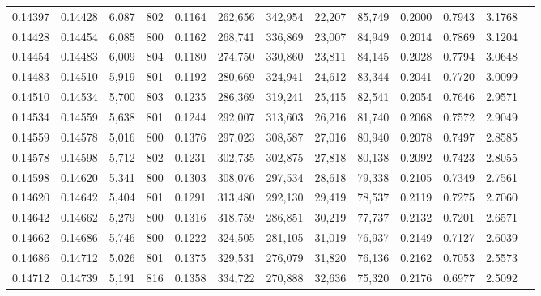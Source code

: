 \begin{tabular}{rrrrrrrrrrrrr}
0.14397 & 0.14428 &  6,087 & 802 &                                     0.1164 & 262,656 & 342,954 &  22,207 &  85,749 & 0.2000 & 0.7943 & 3.1768 \\
0.14428 & 0.14454 &  6,085 & 800 &                                     0.1162 & 268,741 & 336,869 &  23,007 &  84,949 & 0.2014 & 0.7869 & 3.1204 \\
0.14454 & 0.14483 &  6,009 & 804 &                                     0.1180 & 274,750 & 330,860 &  23,811 &  84,145 & 0.2028 & 0.7794 & 3.0648 \\
0.14483 & 0.14510 &  5,919 & 801 &                                     0.1192 & 280,669 & 324,941 &  24,612 &  83,344 & 0.2041 & 0.7720 & 3.0099 \\
0.14510 & 0.14534 &  5,700 & 803 &                                     0.1235 & 286,369 & 319,241 &  25,415 &  82,541 & 0.2054 & 0.7646 & 2.9571 \\
0.14534 & 0.14559 &  5,638 & 801 &                                     0.1244 & 292,007 & 313,603 &  26,216 &  81,740 & 0.2068 & 0.7572 & 2.9049 \\
0.14559 & 0.14578 &  5,016 & 800 &                                     0.1376 & 297,023 & 308,587 &  27,016 &  80,940 & 0.2078 & 0.7497 & 2.8585 \\
0.14578 & 0.14598 &  5,712 & 802 &                                     0.1231 & 302,735 & 302,875 &  27,818 &  80,138 & 0.2092 & 0.7423 & 2.8055 \\
0.14598 & 0.14620 &  5,341 & 800 &                                     0.1303 & 308,076 & 297,534 &  28,618 &  79,338 & 0.2105 & 0.7349 & 2.7561 \\
0.14620 & 0.14642 &  5,404 & 801 &                                     0.1291 & 313,480 & 292,130 &  29,419 &  78,537 & 0.2119 & 0.7275 & 2.7060 \\
0.14642 & 0.14662 &  5,279 & 800 &                                     0.1316 & 318,759 & 286,851 &  30,219 &  77,737 & 0.2132 & 0.7201 & 2.6571 \\
0.14662 & 0.14686 &  5,746 & 800 &                                     0.1222 & 324,505 & 281,105 &  31,019 &  76,937 & 0.2149 & 0.7127 & 2.6039 \\
0.14686 & 0.14712 &  5,026 & 801 &                                     0.1375 & 329,531 & 276,079 &  31,820 &  76,136 & 0.2162 & 0.7053 & 2.5573 \\
0.14712 & 0.14739 &  5,191 & 816 &                                     0.1358 & 334,722 & 270,888 &  32,636 &  75,320 & 0.2176 & 0.6977 & 2.5092 \\

\end{tabular}
